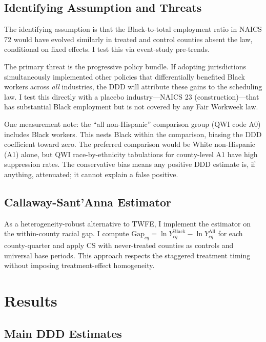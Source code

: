 \documentclass[12pt]{article}
\begin{document}
\subsection{Identifying Assumption and Threats}

The identifying assumption is that the Black-to-total employment ratio in NAICS 72 would have evolved similarly in treated and control counties absent the law, conditional on fixed effects. I test this via event-study pre-trends.

The primary threat is the progressive policy bundle. If adopting jurisdictions simultaneously implemented other policies that differentially benefited Black workers across \textit{all} industries, the DDD will attribute these gains to the scheduling law. I test this directly with a placebo industry---NAICS 23 (construction)---that has substantial Black employment but is not covered by any Fair Workweek law.

One measurement note: the ``all non-Hispanic'' comparison group (QWI code A0) includes Black workers. This nests Black within the comparison, biasing the DDD coefficient toward zero. The preferred comparison would be White non-Hispanic (A1) alone, but QWI race-by-ethnicity tabulations for county-level A1 have high suppression rates. The conservative bias means any positive DDD estimate is, if anything, attenuated; it cannot explain a false positive.

\subsection{Callaway-Sant'Anna Estimator}

As a heterogeneity-robust alternative to TWFE, I implement the \citet{callaway2021} estimator on the within-county racial gap. I compute $\text{Gap}_{cq} = \ln Y_{cq}^{\text{Black}} - \ln Y_{cq}^{\text{All}}$ for each county-quarter and apply CS with never-treated counties as controls and universal base periods. This approach respects the staggered treatment timing without imposing treatment-effect homogeneity.


\section{Results}

\subsection{Main DDD Estimates}
\end{document}
